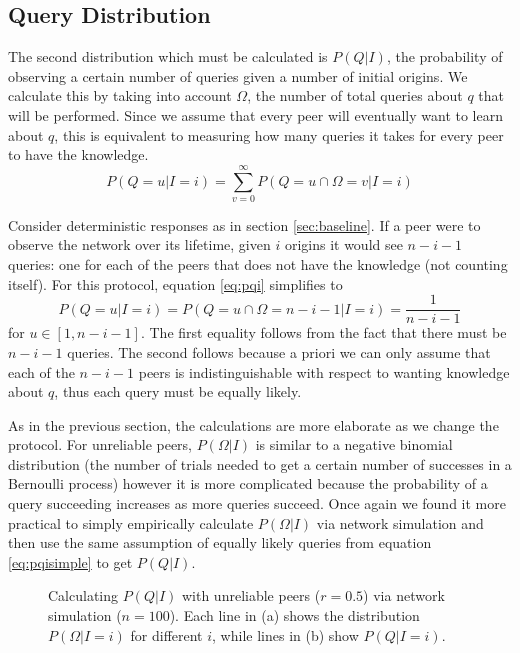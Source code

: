 \documentclass{article}
\newcommand{\eqnref}[1]{equation \eqref{eq:#1}}
\newcommand{\secref}[1]{section \ref{sec:#1}}
\begin{document}
\subsection{Query Distribution}\label{sec:qgiveni}

The second distribution which must be calculated is $P(Q|I)$, the probability of
observing a certain number of queries given a number of initial origins. We
calculate this by taking into account $\Omega$, the number of total queries
about $q$ that will be performed. Since we assume that every peer will
eventually want to learn about $q$, this is equivalent to measuring how many
queries it takes for every peer to have the knowledge.
\begin{equation}\label{eq:pqi}
	P(Q=u|I=i)=\sum_{v=0}^\infty P(Q=u\cap\Omega=v|I=i)
\end{equation}

Consider deterministic responses as in \secref{baseline}. If a peer were to
observe the network over its lifetime, given $i$ origins it would see $n-i-1$
queries: one for each of the peers that does not have the knowledge (not
counting itself). For this protocol, \eqnref{pqi} simplifies to
\begin{equation}\label{eq:pqisimple}
	P(Q=u|I=i)=P(Q=u\cap\Omega=n-i-1|I=i)=\frac{1}{n-i-1}
\end{equation}
for $u\in[1,n-i-1]$. The first equality follows from the fact that there must be
$n-i-1$ queries. The second follows because a priori we can only assume that
each of the $n-i-1$ peers is indistinguishable with respect to wanting knowledge
about $q$, thus each query must be equally likely.

As in the previous section, the calculations are more elaborate as we change the
protocol. For unreliable peers, $P(\Omega|I)$ is similar to a negative binomial
distribution (the number of trials needed to get a certain number of successes
in a Bernoulli process) however it is more complicated because the probability
of a query succeeding increases as more queries succeed. Once again we found it
more practical to simply empirically calculate $P(\Omega|I)$ via network
simulation and then use the same assumption of equally likely queries from
\eqnref{pqisimple} to get $P(Q|I)$.


\begin{figure}%
    \centering
	\caption{Calculating $P(Q|I)$ with unreliable peers ($r=0.5$) via network
	simulation ($n=100$). Each line in (a) shows the distribution
	$P(\Omega|I=i)$ for different $i$, while lines in (b) show $P(Q|I=i)$.}
    \label{fig:unrelqueries}%
\end{figure}
\end{document}
